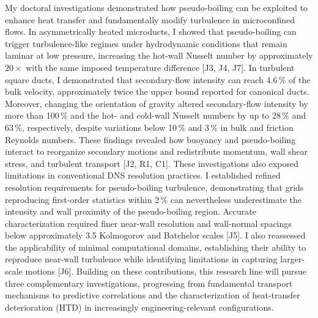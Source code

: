 \documentclass[11pt]{article}
\begin{document}
My doctoral investigations demonstrated how pseudo-boiling can be exploited to enhance heat transfer and fundamentally modify turbulence in microconfined flows.
In asymmetrically heated microducts, I showed that pseudo-boiling can trigger turbulence-like regimes under hydrodynamic conditions that remain laminar at low pressure, increasing the hot-wall Nusselt number by approximately $20\times$ with the same imposed temperature difference [J3, J4, J7].
In turbulent square ducts, I demonstrated that secondary-flow intensity can reach 4.6\,\% of the bulk velocity, approximately twice the upper bound reported for canonical ducts.
Moreover, changing the orientation of gravity altered secondary-flow intensity by more than 100\,\% and the hot- and cold-wall Nusselt numbers by up to 28\,\% and 63\,\%, respectively, despite variations below 10\,\% and 3\,\% in bulk and friction Reynolds numbers.
These findings revealed how buoyancy and pseudo-boiling interact to reorganize secondary motions and redistribute momentum, wall shear stress, and turbulent transport [J2, R1, C1].
These investigations also exposed limitations in conventional DNS resolution practices.
I established refined resolution requirements for pseudo-boiling turbulence, demonstrating that grids reproducing first-order statistics within 2\,\% can nevertheless underestimate the intensity and wall proximity of the pseudo-boiling region.
Accurate characterization required finer near-wall resolution and wall-normal spacings below approximately 3.5 Kolmogorov and Batchelor scales [J5].
I also reassessed the applicability of minimal computational domains, establishing their ability to reproduce near-wall turbulence while identifying limitations in capturing larger-scale motions [J6].
Building on these contributions, this research line will pursue three complementary investigations, progressing from fundamental transport mechanisms to predictive correlations and the characterization of heat-transfer deterioration (HTD) in increasingly engineering-relevant configurations.
\end{document}
